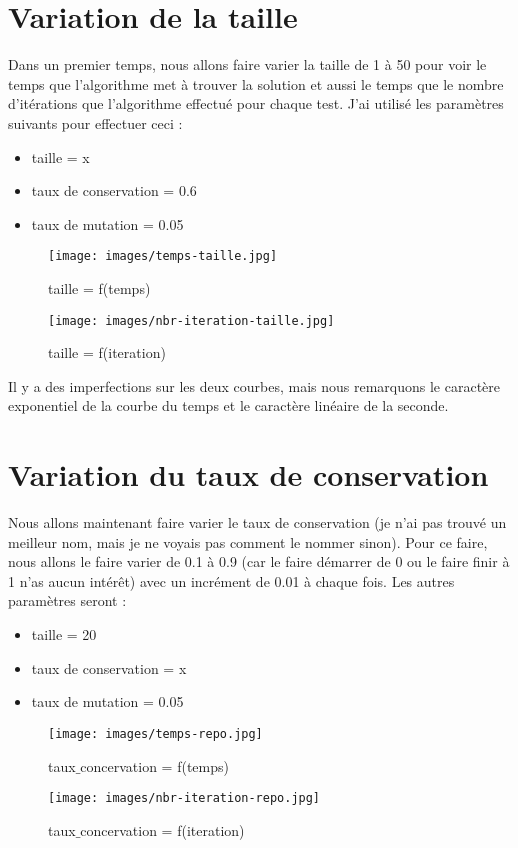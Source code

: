 \documentclass[french,12pt,a4paper]{report}
\begin{document}
\section{Variation de la taille}
Dans un premier temps, nous allons faire varier la taille de 1 à 50 pour voir le temps que l'algorithme met à trouver la solution et aussi le temps que le nombre d'itérations que l'algorithme effectué pour chaque test. J'ai utilisé les paramètres suivants pour effectuer ceci :
\begin{itemize}
\item taille = x
\item taux de conservation = 0.6
\item taux de mutation = 0.05
\end{itemize}
\begin{figure}[!htb]
   \begin{minipage}{0.48\textwidth}
     \centering
     \texttt{[image: images/temps-taille.jpg]}
     \caption{taille = f(temps)}\label{Fig:Data1-1}
   \end{minipage}\hfill
   \begin{minipage}{0.48\textwidth}
     \centering
     \texttt{[image: images/nbr-iteration-taille.jpg]}
     \caption{taille = f(iteration)}\label{Fig:Data2-1}
   \end{minipage}
\end{figure}
Il y a des imperfections sur les deux courbes, mais nous remarquons le caractère exponentiel de la courbe du temps et le caractère linéaire de la seconde.

\newpage

\section{Variation du taux de conservation}
Nous allons maintenant faire varier le taux de conservation (je n'ai pas trouvé un meilleur nom, mais je ne voyais pas comment le nommer sinon). Pour ce faire, nous allons le faire varier de 0.1 à 0.9 (car le faire démarrer de 0 ou le faire finir à 1 n'as aucun intérêt) avec un incrément de 0.01 à chaque fois. Les autres paramètres seront :
\begin{itemize}
\item taille = 20
\item taux de conservation = x
\item taux de mutation = 0.05
\end{itemize}
\begin{figure}[!htb]
   \begin{minipage}{0.48\textwidth}
     \centering
     \texttt{[image: images/temps-repo.jpg]}
     \caption{taux$\_$concervation = f(temps)}\label{Fig:Data1-1}
   \end{minipage}\hfill
   \begin{minipage}{0.48\textwidth}
     \centering
     \texttt{[image: images/nbr-iteration-repo.jpg]}
     \caption{taux$\_$concervation = f(iteration)}\label{Fig:Data2-2}
   \end{minipage}
\end{figure}
\end{document}
